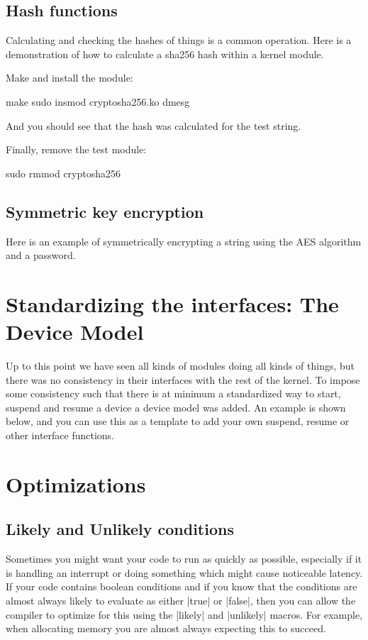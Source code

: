 \documentclass[10pt, oneside]{book}
\begin{document}
\subsection{Hash functions}
\label{sec:hashfunc}

Calculating and checking the hashes of things is a common operation.
Here is a demonstration of how to calculate a sha256 hash within a kernel module.


Make and install the module:

\begin{codebash}
make
sudo insmod cryptosha256.ko
dmesg
\end{codebash}

And you should see that the hash was calculated for the test string.

Finally, remove the test module:

\begin{codebash}
sudo rmmod cryptosha256
\end{codebash}

\subsection{Symmetric key encryption}
\label{sec:org2fab20b}
Here is an example of symmetrically encrypting a string using the AES algorithm and a password.


\section{Standardizing the interfaces: The Device Model}
\label{sec:device_model}
Up to this point we have seen all kinds of modules doing all kinds of things, but there was no consistency in their interfaces with the rest of the kernel.
To impose some consistency such that there is at minimum a standardized way to start, suspend and resume a device a device model was added.
An example is shown below, and you can use this as a template to add your own suspend, resume or other interface functions.


\section{Optimizations}
\label{sec:optimization}
\subsection{Likely and Unlikely conditions}
\label{sec:likely_unlikely}
Sometimes you might want your code to run as quickly as possible, especially if it is handling an interrupt or doing something which might cause noticeable latency.
If your code contains boolean conditions and if you know that the conditions are almost always likely to evaluate as either \cpp|true| or \cpp|false|,
then you can allow the compiler to optimize for this using the \cpp|likely| and \cpp|unlikely| macros.
For example, when allocating memory you are almost always expecting this to succeed.
\end{document}
